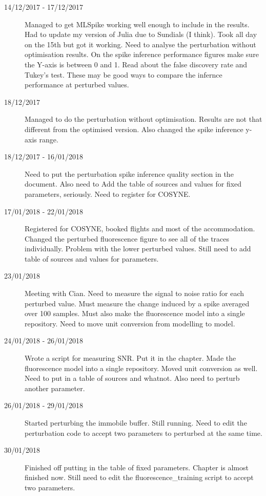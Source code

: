 \documentclass[a4paper,12pt]{article}
\theoremstyle{definition}
\begin{document}
\begin{description}
	\item[14/12/2017 - 17/12/2017] Managed to get MLSpike working well enough to include in the results. Had to update my version of Julia due to Sundials (I think). Took all day on the 15th but got it working. Need to analyse the perturbation without optimisation results. On the spike inference performance figures make sure the Y-axis is between 0 and 1. Read about the false discovery rate and Tukey's test. These may be good ways to compare the infernce performance at perturbed values.

	\item[18/12/2017] Managed to do the perturbation without optimisation. Results are not that different from the optimised version. Also changed the spike inference y-axis range.

	\item[18/12/2017 - 16/01/2018] Need to put the perturbation spike inference quality section in the document. Also  need to Add the table of sources and values for fixed parameters, seriously. Need to register for COSYNE.

	\item[17/01/2018 - 22/01/2018] Registered for COSYNE, booked flights and most of the accommodation. Changed the perturbed fluorescence figure to see all of the traces individually. Problem with the lower perturbed values. Still need to add table of sources and values for parameters.

	\item[23/01/2018] Meeting with Cian. Need to measure the signal to noise ratio for each perturbed value. Must measure the change induced by a spike averaged over 100 samples. Must also make the fluorescence model into a single repository. Need to move unit conversion from modelling to model.

	\item[24/01/2018 - 26/01/2018] Wrote a script for measuring SNR. Put it in the chapter. Made the fluorescence model into a single repository. Moved unit conversion as well. Need to put in a table of sources and whatnot. Also need to perturb another parameter.

	\item[26/01/2018 - 29/01/2018] Started perturbing the immobile buffer. Still running. Need to edit the perturbation code to accept two parameters to perturbed at the same time.

	\item[30/01/2018] Finished off putting in the table of fixed parameters. Chapter is almost finished now. Still need to edit the fluorescence\_training script to accept two parameters.


\end{description}
\end{document}
